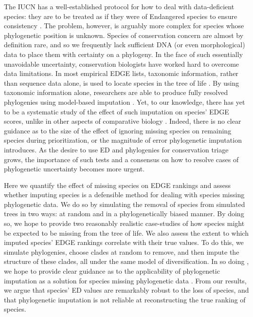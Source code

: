 \documentclass[12pt,english]{article}
\begin{document}
The IUCN has a well-established protocol for how to deal with
data-deficient species: they are to be treated as if they were of
Endangered species to ensure consistency \autocite[check this
Bodie][]{Rodrigues2006}. The problem, however, is arguably more
complex for species whose phylogenetic position is unknown.
Species of conservation concern are almost by definition rare, and so
we frequently lack sufficient DNA (or even morphological) data to
place them with certainty on a phylogeny. In the face of such essentially unavoidable uncertainty, 
conservation biologists have worked hard to overcome data limitations.
In most empirical EDGE lists, taxonomic information, rather
than sequence data alone, is used to locate species in the tree of life 
\autocite{Isaac2007, Isaac2012, Jetz2014, Curnick2015, Stein2018}.%
By using taxonomic information alone, researchers are able to produce fully
resolved phylogenies using model-based imputation \autocite{Kuhn2011}.%
Yet, to our knowledge, there has yet to be a systematic study of the effect of such imputation on species' EDGE scores, unlike in other aspects of comparative biology \autocite{Rabosky2014}.
Indeed, there is no clear guidance as to the size of the effect of
ignoring missing species on remaining species during prioritization,
or the magnitude of error phylogenetic imputation introduces. %
As the desire to use ED and
phylogenies for conservation triage grows, the importance of such tests and a
consensus on how to resolve cases of phylogenetic uncertainty becomes more
urgent.

Here we quantify the effect of missing species on EDGE rankings and assess
whether imputing species is a defensible method for dealing with species
missing phylogenetic data. We do so by simulating the removal of species from simulated trees in two ways: at random and
in a phylogenetically biased manner. By doing so, we hope to provide
two reasonably realistic case-studies of how species might be expected to be missing
from the tree of life. We also assess the extent to which imputed species' EDGE rankings
correlate with their true values. To do this, we
simulate phylogenies, choose clades at random to remove, and then impute the structure
of these clades, all under the same model of diversification. In so doing
, we hope to provide clear guidance as to the applicability of phylogenetic imputation
as a solution for species missing phylogenetic data
.
From our results, we argue that species' ED values are remarkably
robust to the loss of species, and that phylogenetic imputation is not
reliable at reconstructing the true ranking of species.
\end{document}
